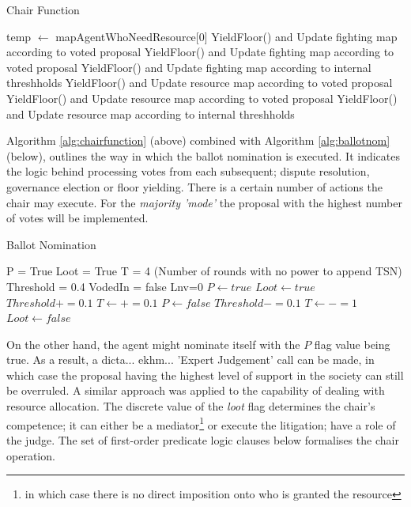 \begin{algorithm}[htb]
\begin{algorithmic}
\caption{Chair Function}\label{alg:chairfunction}
\State temp $\leftarrow$ mapAgentWhoNeedResource[0]
\State YieldFloor() and Update fighting map according to voted proposal
\Else
{}
\State YieldFloor() and Update fighting map according to voted proposal
\Else
\State YieldFloor() and Update fighting map according to internal threshholds
\EndIf
\EndIf
\EndIf
{}
\State YieldFloor() and Update resource map according to voted proposal
\Else
{}
\State YieldFloor() and Update resource map according to voted proposal
\Else
\State YieldFloor() and Update resource map according to internal threshholds
\EndIf
\EndIf
\EndIf
\end{algorithmic}
\end{algorithm}

Algorithm \ref{alg:chairfunction} (above) combined with Algorithm \ref{alg:ballotnom} (below), outlines the way in which the ballot nomination is executed. It indicates the logic behind processing votes from each subsequent; dispute resolution, governance election or floor yielding. There is a certain number of actions the chair may execute. For the \textit{majority 'mode'} the proposal with the highest number of votes will be implemented. 

\begin{algorithm}[htb]
\caption{Ballot Nomination}\label{alg:ballotnom}
\begin{algorithmic}
\scriptsize
\State P = True
\State Loot = True
\State T = 4   (Number of rounds with no power to append TSN)
\State Threshold = 0.4
\State VodedIn = false
\State Lnv=0
\State
{}
\State $P \leftarrow true$
\State $Loot \leftarrow true$
\State $Threshold += 0.1$
\State $T \leftarrow += 0.1$
\Else
{}
\State $P \leftarrow false$
\State $Threshold -= 0.1$
\State $T \leftarrow -= 1$
\EndIf
{}
\State $Loot \leftarrow false$
\EndIf
\EndIf
\end{algorithmic}
\end{algorithm}

On the other hand, the agent might nominate itself with the $P$ flag value being true. As a result, a dicta... ekhm... 'Expert Judgement' call can be made,  in which case the proposal having the highest level of support in the society can still be overruled. A similar approach was applied to the capability of dealing with resource allocation. The discrete value of the \textit{loot} flag determines the chair's competence; it can either be a mediator\footnote{in which case there is no direct imposition onto who is granted the resource} or execute the litigation; have a role of the judge. The set of first-order predicate logic clauses below formalises the chair operation.

